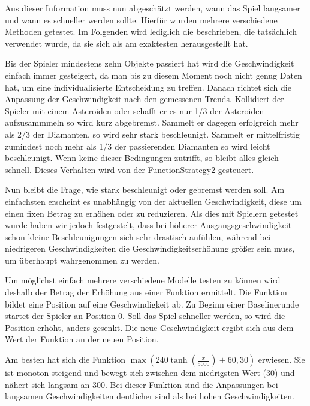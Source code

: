\documentclass[a4paper,12pt]{scrartcl}
\begin{document}
Aus dieser Information muss nun abgeschätzt werden, wann das Spiel langsamer und wann
es schneller werden sollte. Hierfür wurden mehrere verschiedene Methoden getestet. Im
Folgenden wird lediglich die beschrieben, die tatsächlich verwendet wurde, da sie sich als
am exaktesten herausgestellt hat.

Bis der Spieler mindestens zehn Objekte passiert hat wird die Geschwindigkeit einfach
immer gesteigert, da man bis zu diesem Moment noch nicht genug Daten hat, um
eine individualisierte Entscheidung zu treffen. Danach richtet sich die Anpassung der
Geschwindigkeit nach den gemessenen Trends. Kollidiert der Spieler mit einem Asteroiden
oder schafft er es nur 1/3 der Asteroiden aufzusammmeln so wird kurz abgebremst.
Sammelt er dagegen erfolgreich mehr als 2/3 der Diamanten, so wird sehr stark
beschleunigt. Sammelt er mittelfristig zumindest noch mehr als 1/3 der
passierenden Diamanten so wird leicht beschleunigt. Wenn keine dieser Bedingungen zutrifft, so bleibt alles gleich schnell. Dieses
Verhalten wird von der FunctionStrategy2 gesteuert.

Nun bleibt die Frage, wie stark beschleunigt oder gebremst werden soll. Am einfachsten
erscheint es unabhängig von der aktuellen Geschwindigkeit, diese um einen fixen Betrag
zu erhöhen oder zu reduzieren. Als dies mit Spielern getestet wurde haben wir jedoch
festgestelt, dass bei höherer Ausgangsgeschwindigkeit schon kleine Beschleunigungen
sich sehr drastisch anfühlen, während bei niedrigeren Geschwindigkeiten die
Geschwindigkeitserhöhung größer sein muss, um überhaupt wahrgenommen zu werden.

Um möglichst einfach mehrere verschiedene Modelle testen zu können wird deshalb der
Betrag der Erhöhung aus einer Funktion ermittelt. Die Funktion bildet eine Position auf
eine Geschwindigkeit ab. Zu Beginn einer Baselinerunde startet der Spieler an Position
0. Soll das Spiel schneller werden, so wird die Position erhöht, anders gesenkt. Die neue
Geschwindigkeit ergibt sich aus dem Wert der Funktion an der neuen Position.

Am besten hat sich die Funktion $\max(240 \tanh(\frac{x}{5000})+60,
30)$ erwiesen. Sie ist monoton steigend und bewegt sich zwischen dem niedrigsten
Wert (30) und nähert sich langsam an 300. Bei dieser Funktion sind die Anpassungen 
bei langsamen Geschwindigkeiten deutlicher sind als bei hohen Geschwindigkeiten.
\end{document}
